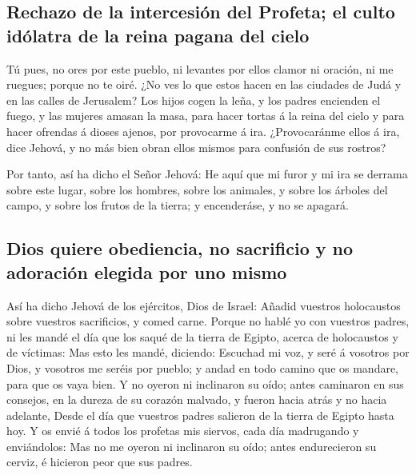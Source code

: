 \hypertarget{rechazo-de-la-intercesiuxf3n-del-profeta-el-culto-iduxf3latra-de-la-reina-pagana-del-cielo}{%
\subsection{Rechazo de la intercesión del Profeta; el culto idólatra de
la reina pagana del
cielo}\label{rechazo-de-la-intercesiuxf3n-del-profeta-el-culto-iduxf3latra-de-la-reina-pagana-del-cielo}}

 Tú pues, no ores por este pueblo, ni levantes por ellos
clamor ni oración, ni me ruegues; porque no te oiré.  ¿No
ves lo que estos hacen en las ciudades de Judá y en las calles de
Jerusalem?  Los hijos cogen la leña, y los padres
encienden el fuego, y las mujeres amasan la masa, para hacer tortas á la
reina del cielo y para hacer ofrendas á dioses ajenos, por provocarme á
ira.  ¿Provocaránme ellos á ira, dice Jehová, y no más
bien obran ellos mismos para confusión de sus rostros?

 Por tanto, así ha dicho el Señor Jehová: He aquí que mi
furor y mi ira se derrama sobre este lugar, sobre los hombres, sobre los
animales, y sobre los árboles del campo, y sobre los frutos de la
tierra; y encenderáse, y no se apagará.

\hypertarget{dios-quiere-obediencia-no-sacrificio-y-no-adoraciuxf3n-elegida-por-uno-mismo}{%
\subsection{Dios quiere obediencia, no sacrificio y no adoración elegida
por uno
mismo}\label{dios-quiere-obediencia-no-sacrificio-y-no-adoraciuxf3n-elegida-por-uno-mismo}}

 Así ha dicho Jehová de los ejércitos, Dios de Israel:
Añadid vuestros holocaustos sobre vuestros sacrificios, y comed carne.
 Porque no hablé yo con vuestros padres, ni les mandé el
día que los saqué de la tierra de Egipto, acerca de holocaustos y de
víctimas:  Mas esto les mandé, diciendo: Escuchad mi voz,
y seré á vosotros por Dios, y vosotros me seréis por pueblo; y andad en
todo camino que os mandare, para que os vaya bien.  Y no
oyeron ni inclinaron su oído; antes caminaron en sus consejos, en la
dureza de su corazón malvado, y fueron hacia atrás y no hacia adelante,
 Desde el día que vuestros padres salieron de la tierra
de Egipto hasta hoy. Y os envié á todos los profetas mis siervos, cada
día madrugando y enviándolos:  Mas no me oyeron ni
inclinaron su oído; antes endurecieron su cerviz, é hicieron peor que
sus padres.

